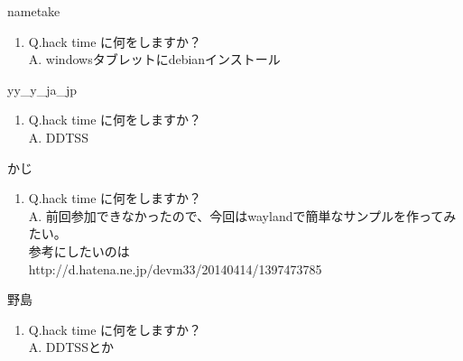 \begin{prework}{ nametake }
  \begin{enumerate}
  \item Q.hack time に何をしますか？\\
    A. windowsタブレットにdebianインストール
  \end{enumerate}
\end{prework}

\begin{prework}{ yy\_y\_ja\_jp }
  \begin{enumerate}
  \item Q.hack time に何をしますか？\\
    A. DDTSS
  \end{enumerate}
\end{prework}

\begin{prework}{ かじ }
  \begin{enumerate}
  \item Q.hack time に何をしますか？\\
    A. 前回参加できなかったので、今回はwaylandで簡単なサンプルを作ってみたい。\\
参考にしたいのは\\
http://d.hatena.ne.jp/devm33/20140414/1397473785
  \end{enumerate}
\end{prework}

\begin{prework}{ 野島 }
  \begin{enumerate}
  \item Q.hack time に何をしますか？\\
    A. DDTSSとか
  \end{enumerate}
\end{prework}



